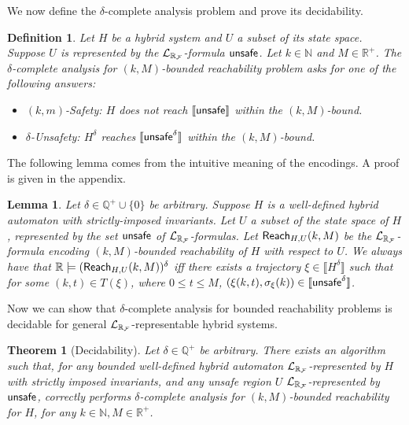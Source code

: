 \documentclass[journal]{IEEEtran}
\newtheorem{definition}{Definition}
\newtheorem{theorem}{Theorem}
\newtheorem{lemma}{Lemma}
\begin{document}
We now define the $\delta$-complete analysis problem and prove its decidability.
\begin{definition}
Let $H$ be a hybrid system and $U$ a subset of its state space. Suppose $U$ is represented by the $\mathcal{L}_{\mathbb{R}_{\mathcal{F}}}$-formula $\mathsf{unsafe}$. Let $k\in \mathbb{N}$ and $M\in \mathbb{R}^+$. The $\delta$-complete analysis for $(k,M)$-bounded reachability problem asks for one of the following answers:
\begin{itemize}
\item {\sf $(k,m)$-Safety:} $H$ does not reach $\llbracket\mathsf{unsafe}\rrbracket$ within the $(k,M)$-bound.
\item {\sf $\delta$-Unsafety:} $H^{\delta}$ reaches $\llbracket\mathsf{unsafe}^{\delta}\rrbracket$ within the $(k,M)$-bound.
\end{itemize}
\end{definition}
The following lemma comes from the intuitive meaning of the encodings. A proof is given in the appendix.
\begin{lemma}\label{equiv-delta}
Let $\delta\in\mathbb{Q}^+\cup \{0\}$ be arbitrary. Suppose $H$ is a well-defined hybrid automaton with strictly-imposed invariants. Let $U$ a subset of the state space of $H$, represented by the set  $\mathsf{unsafe}$ of $\mathcal{L}_{\mathbb{R}_{\mathcal{F}}}$-formulas. Let $\mathsf{Reach}_{H,U}(k,M)$ be the $\mathcal{L}_{\mathbb{R}_{\mathcal{F}}}$-formula encoding $(k,M)$-bounded reachability of $H$ with respect to $U$.  We always have that $\mathbb{R}\models(\mathsf{Reach}_{H,U}(k,M))^{\delta}$ iff there exists a trajectory $\xi\in\llbracket H^{\delta}\rrbracket$ such that for some $(k,t)\in T(\xi)$, where $0\leq t\leq M$, $(\xi(k, t), \sigma_{\xi}(k))\in \llbracket \mathsf{unsafe}^{\delta}\rrbracket$.
\end{lemma}
Now we can show that $\delta$-complete analysis for bounded reachability problems is decidable for general $\mathcal{L}_{\mathbb{R}_{\mathcal{F}}}$-representable hybrid systems.
\begin{theorem}[Decidability]
Let $\delta\in \mathbb{Q}^+$ be arbitrary. There exists an algorithm such that, for any bounded well-defined hybrid automaton $\mathcal{L}_{\mathbb{R}_{\mathcal{F}}}$-represented by $H$ with strictly imposed invariants, and any unsafe region $U$ $\mathcal{L}_{\mathbb{R}_{\mathcal{F}}}$-represented by $\mathsf{unsafe}$, correctly performs $\delta$-complete analysis for $(k,M)$-bounded reachability for $H$, for any $k\in \mathbb{N}, M\in \mathbb{R}^+$.
\end{theorem}
\end{document}
